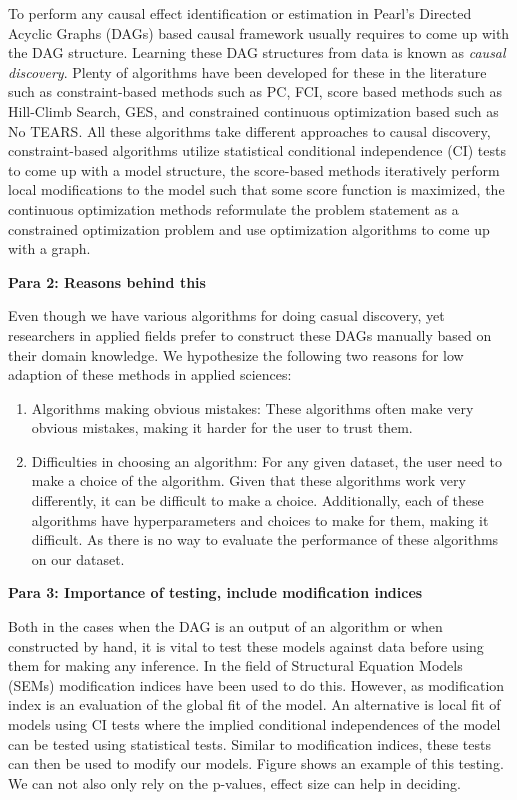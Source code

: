 \documentclass{article}
\begin{document}
To perform any causal effect identification or estimation in Pearl's Directed
Acyclic Graphs (DAGs) based causal framework usually requires to come up with
the DAG structure. Learning these DAG structures from data is known as
\emph{causal discovery}. Plenty of algorithms have been developed for these in
the literature such as constraint-based methods such as PC, FCI, score based
methods such as Hill-Climb Search, GES, and constrained continuous optimization
based such as No TEARS. All these algorithms take different approaches to
causal discovery, constraint-based algorithms utilize statistical conditional
independence (CI) tests to come up with a model structure, the score-based
methods iteratively perform local modifications to the model such that some
score function is maximized, the continuous optimization methods reformulate
the problem statement as a constrained optimization problem and use
optimization algorithms to come up with a graph.

\textbf{Para 2: Reasons behind this}

Even though we have various algorithms for doing casual discovery, yet
researchers in applied fields prefer to construct these DAGs manually based on
their domain knowledge. We hypothesize the following two reasons for low
adaption of these methods in applied sciences:

\begin{enumerate}
	\item Algorithms making obvious mistakes: These algorithms often 
		make very obvious mistakes, making it harder for the user
		to trust them.
	\item Difficulties in choosing an algorithm: For any given dataset, the
		user need to make a choice of the algorithm. Given that these
		algorithms work very differently, it can be difficult to make a
		choice. Additionally, each of these algorithms have
		hyperparameters and choices to make for them, making it
		difficult. As there is no way to evaluate the performance of 
		these algorithms on our dataset.
\end{enumerate}

\textbf{Para 3: Importance of testing, include modification indices}

Both in the cases when the DAG is an output of an algorithm or when constructed
by hand, it is vital to test these models against data before using them for
making any inference. In the field of Structural Equation Models (SEMs)
modification indices have been used to do this. However, as modification index
is an evaluation of the global fit of the model. An alternative is local fit of
models using CI tests where the implied conditional independences of the model
can be tested using statistical tests. Similar to modification indices, these
tests can then be used to modify our models. Figure shows an example of this
testing. We can not also only rely on the p-values, effect size can help in
deciding.
\end{document}
